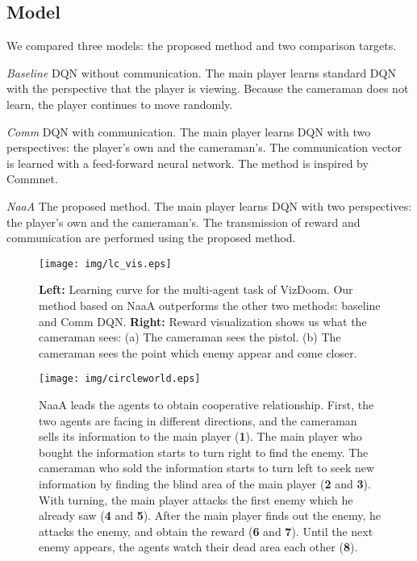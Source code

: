 \subsection{Model}
We compared three models: the proposed method and two comparison targets.

{\em Baseline} DQN without communication. The main player learns standard DQN with the perspective that the player is viewing.
Because the cameraman does not learn, the player continues to move randomly.

{\em Comm} DQN with communication. The main player learns DQN with two perspectives: the player's own and the cameraman's.
The communication vector is learned with a feed-forward neural network. The method is inspired by Commnet.

{\em NaaA} The proposed method. The main player learns DQN with two perspectives: the player's own and the cameraman's.
The transmission of reward and communication are performed using the proposed method.

\begin{figure*}[t]
\centering
\texttt{[image: img/lc\_vis.eps]}
\caption{
	\textbf{Left:}
		Learning curve for the multi-agent task of VizDoom. 
		Our method based on NaaA outperforms the other two methods: baseline and Comm DQN.
	\textbf{Right:} 
		Reward visualization shows us what the cameraman sees:
		(a) The cameraman sees the pistol.
		(b) The cameraman sees the point which enemy appear and come closer.
}
\label{fig:lc_vis}
\end{figure*}

\begin{figure*}[t]
\centering
\texttt{[image: img/circleworld.eps]}
\caption{
NaaA leads the agents to obtain cooperative relationship.
First, the two agents are facing in different directions,
and the cameraman sells its information to the main player (\textbf{1}).
The main player who bought the information starts to turn right to find the enemy.
The cameraman who sold the information starts to turn left to seek new information by finding the blind area of the main player (\textbf{2} and \textbf{3}).
With turning, the main player attacks the first enemy which he already saw (\textbf{4} and \textbf{5}).
After the main player finds out the enemy, he attacks the enemy, and obtain the reward  (\textbf{6} and \textbf{7}).
Until the next enemy appears, the agents watch their dead area each other (\textbf{8}).
}
\label{fig:circleworld}
\end{figure*}

